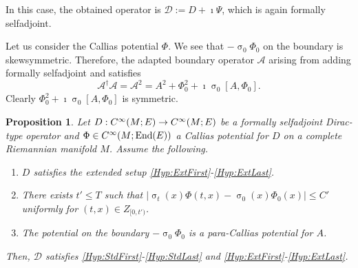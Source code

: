 \documentclass[a4paper,10pt,reqno]{amsart}
\newcommand{\sym}{\upsigma}
\newcommand{\modulus}[1]{|#1|}
\newcommand{\Ck}[2][{}]{{\rm C}^{#2}_{\rm #1}}%
\DeclareMathOperator{\End}{End} %
\newcommand{\DDD}{\mathscr{D}}%
\newcommand{\AAA}{\mathscr{A}}%
\newtheorem{proposition}[theorem]{Proposition}
\theoremstyle{definition}
\begin{document}
In this case, the obtained operator is $\DDD := D + \imath \Psi$, which is again formally selfadjoint.

Let us consider the Callias potential $\Phi$.
We see that $-\sym_0 \Phi_0$ on the boundary is skewsymmetric.
Therefore, the adapted boundary operator $\AAA$ arising from adding formally selfadjoint and satisfies
$$\AAA^\dagger \AAA = \AAA^2  = A^2  + \Phi_0^2 + \imath \sym_0[A,\Phi_0].$$
Clearly $\Phi_0^2 + \imath \sym_0[A,\Phi_0]$ is symmetric. 

\begin{proposition}
\label{Prop:SetupSticks}
Let $D: \Ck{\infty}(M;E) \to \Ck{\infty}(M;E)$ be a formally selfadjoint Dirac-type operator and  $\Phi \in \Ck{\infty}(M;\End(E))$ a Callias potential for $D$ on a complete Riemannian manifold $M$. 
Assume the following.
\begin{enumerate}[label=(\roman*), labelwidth=0pt, labelindent=2pt, leftmargin=21pt]
\item 
\label{Itm:SetupSticks:1}
$D$ satisfies the  extended setup \ref{Hyp:ExtFirst}-\ref{Hyp:ExtLast}. 
\item 
\label{Itm:SetupSticks:2} 
There exists $t' \leq T$ such that $\modulus{\sym_t(x) \Phi(t,x) - \sym_0(x)\Phi_0(x)} \leq C'$ uniformly for $(t,x) \in Z_{[0,t')}$.
\item 
\label{Itm:SetupSticks:3}
The potential on the boundary $-\sym_0 \Phi_0$ is a para-Callias potential for $A$. 
\end{enumerate}
Then, $\DDD$ satisfies  \ref{Hyp:StdFirst}-\ref{Hyp:StdLast} and \ref{Hyp:ExtFirst}-\ref{Hyp:ExtLast}.
\end{proposition}
\end{document}
